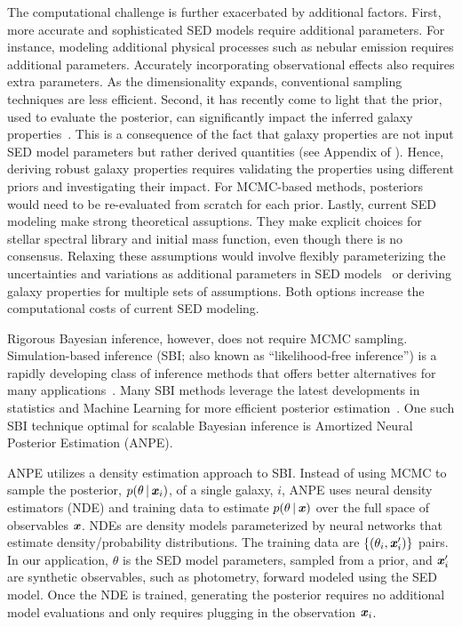 The computational challenge is further exacerbated by additional factors. 
First, more accurate and sophisticated SED models require additional
parameters. 
For instance, modeling additional physical processes such as nebular emission
requires additional parameters. 
Accurately incorporating observational effects also requires extra parameters.
As the dimensionality expands, conventional sampling techniques are less
efficient. 
Second, it has recently come to light that the prior, used to evaluate the
posterior, can significantly impact the inferred galaxy
properties~\citep{carnall2017, leja2017, hahn2022}. 
This is a consequence of the fact that galaxy properties are not input SED
model parameters but rather derived quantities (see Appendix of
\citealt{hahn2022}).
Hence, deriving robust galaxy properties requires validating the properties
using different priors and investigating their impact. 
For MCMC-based methods, posteriors would need to be re-evaluated from scratch
for each prior.
Lastly, current SED modeling make strong theoretical assuptions. 
They make explicit choices for stellar spectral library and initial mass
function, even though there is no consensus. 
Relaxing these assumptions would involve flexibly parameterizing the
uncertainties and variations as additional parameters in SED
models~\citep{conroy2009, conroy2010} or deriving galaxy properties for
multiple sets of assumptions. 
Both options increase the computational costs of current SED modeling.  

Rigorous Bayesian inference, however, does not require MCMC sampling. 
Simulation-based inference (SBI; also known as ``likelihood-free inference'')
is a rapidly developing class of inference methods that offers better
alternatives for many applications~\citep[see][and reference
therein]{cranmer2020}.
Many SBI methods leverage the latest developments in statistics and Machine
Learning for more efficient posterior estimation~\citep{papamakarios2017,
alsing2019a, hahn2019c, dax2021, huppenkothen2021, zhang2021}. 
One such SBI technique optimal for scalable Bayesian inference is Amortized
Neural Posterior Estimation (ANPE). 

ANPE utilizes a density estimation approach to SBI. 
Instead of using MCMC to sample the posterior, $p(\theta \,|\, \textbf{\textit{x}}_i)$, 
of a single galaxy, $i$, ANPE uses neural density estimators (NDE) and training
data to estimate $p(\theta\,|\,\textbf{\textit{x}})$  over the full space of observables
$\textbf{\textit{x}}$.
NDEs are density models parameterized by neural networks that estimate
density/probability distributions. 
The training data are $\{(\theta_i, \textbf{\textit{x}}'_i)\}$ pairs.
In our application, $\theta$ is the SED model parameters, sampled from a 
prior, and $\textbf{\textit{x}}'_i$ are synthetic observables, such as photometry, forward
modeled using the SED model. 
Once the NDE is trained, generating the posterior requires no additional model
evaluations and only requires plugging in the observation $\textbf{\textit{x}}_i$.

